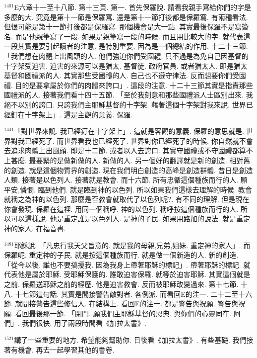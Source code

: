 \documentclass{book}
\begin{document}
$^{1401}$E六章十一至十八節.
第十三頁.
第一.
首先保羅說.
請看我親手寫給你們的字是多麼的大.
究竟是第十一節是保羅寫.
還是第十一節打後都是保羅寫.
有兩種看法.
但很可能是第十一節打後都是保羅寫.
那個機會是大一點.
其實最後保羅不是寫簽名.
而是他親筆寫了一段.
如果是親筆寫一段的時候.
而且用比較大的字.
就代表這一段其實是要引起讀者的注意.
是特別重要.
因為是一個總結的作用.
十二十三節.
「我們想在肉體上出風頭的人.
他們強迫你們受國禮.
只不過是為免自己因基督的十字架受迫害.
迫害的來源可以是猶太.
基督徒.
政府官員.
或者猶太人.
即是猶太基督和國禮派的人.
其實那些受國禮的人.
自己也不遵守律法.
反而想要你們受國禮.
目的是要拿屬於你們的肉體來誇口」.
這段的注意.
十二十三節其實是指責那些國禮派的人.
接著我們看十四十五節.
「至於我刻意和那些國禮派人士區別出來.
我絕不以別的誇口.
只誇我們主耶穌基督的十字架.
藉著這個十字架對我來說.
世界已經釘在十字架上」.
這是主觀的意義.
保羅.

$^{1441}$「對世界來說.
我已經釘在十字架上」.
這就是客觀的意義.
保羅的意思就是.
世界對我已經死了.
而世界看我也已經死了.
世界對你已經死了的時候.
你自然就不會去追求肉體上出風頭.
即是十二節.
或者以人去誇口.
其實守國禮或不守國禮都算不上甚麼.
最要緊的是做新做的人.
新做的人.
另一個好的翻譯就是新的創造.
相對舊的創造.
就是這個物質界的創造.
現在我們明白創造的高峰是創造群體.
昔日是創造人類.
接著是以色列人.
接著就是教會.
而十六節.
所有忠循這個種族而行的人.
願平安,憐憫.
臨到他們.
就是臨到神的以色列.
所以如果我們這樣去理解的時候.
教會就稱之為神的以色列.
那麼是否教會就取代了以色列呢?.
有不同的理解.
但是現在你會發現.
保羅在這裡.
用同一個稱呼.
神的以色列.
稱呼按這個種族而行的人.
所以可以這樣說.
他是重定誰是以色列人.
是神的子民.
如果用路加的說法.
就是重定神的家人.
在福音書.

$^{1481}$耶穌說.
「凡忠行我天父旨意的.
就是我的母親,兄弟,姐妹.
重定神的家人」.
而保羅呢.
重定神的子民.
就是按這個種族而行.
就是做一個新造的人.
新的創造.
「從今以後.
誰也不要搞擾我.
因為我身上帶著耶穌的標記」.
帶著耶穌的標記.
就代表他是屬於耶穌.
受耶穌保護的.
誰敢迫害保羅.
就等於迫害耶穌.
其實這個就是之前.
保羅送耶穌之前的經歷.
他是迫害教會.
反而被耶穌改變過來.
第十七節.
十八.
十七節這句話.
其實是間接警告敵對者.
各例派.
而看回E的注一.
二十二至十六節.
就間接警告這些修信人.
在結構上.
看回E的注一.
都是警告與祝願.
警告與祝願.
看回最後那一節.
「閉門.
願我們主耶穌基督的恩典.
與你們的心靈同在.
阿們」.
我們很快.
用了兩段時間看《加拉太書》.

$^{1521}$講了一些重要的地方.
希望能夠幫助你.
日後看《加拉太書》.
有些基礎.
我們接著有機會.
再去一起學習其他的書卷.
\newpage
\end{document}
